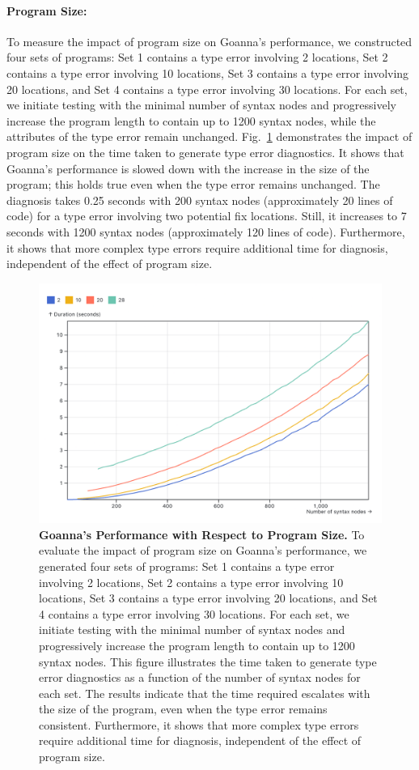 \documentclass[pdflatex,lineno,sn-nature,Numbered]{sn-jnl}%
\begin{document}
\paragraph{Program Size:}
To measure the impact of program size on Goanna's performance, we constructed four sets of programs: Set 1 contains a type error involving 2 locations, Set 2 contains a type error involving 10 locations, Set 3 contains a type error involving 20 locations, and Set 4 contains a type error involving 30 locations. For each set, we initiate testing with the minimal number of syntax nodes and progressively increase the program length to contain up to 1200 syntax nodes, while the attributes of the type error remain unchanged. Fig.~\ref{fig:node-size} demonstrates the impact of program size on the time taken to generate type error diagnostics. It shows that Goanna's performance is slowed down with the increase in the size of the program; this holds true even when the type error remains unchanged. The diagnosis takes 0.25 seconds with 200 syntax nodes (approximately 20 lines of code) for a type error involving two potential fix locations. Still, it increases to 7 seconds with 1200 syntax nodes (approximately 120 lines of code). Furthermore, it shows that more complex type errors require additional time for diagnosis, independent of the effect of program size.

\begin{figure}[ht]
    \centering
    \includegraphics[width=0.8\linewidth]{images/program-size.png}
    \caption{{\bf Goanna's Performance with Respect to Program Size.} To evaluate the impact of program size on Goanna's performance, we generated four sets of programs: Set 1 contains a type error involving 2 locations, Set 2 contains a type error involving 10 locations, Set 3 contains a type error involving 20 locations, and Set 4 contains a type error involving 30 locations. For each set, we initiate testing with the minimal number of syntax nodes and progressively increase the program length to contain up to 1200 syntax nodes. This figure illustrates the time taken to generate type error diagnostics as a function of the number of syntax nodes for each set. The results indicate that the time required escalates with the size of the program, even when the type error remains consistent. Furthermore, it shows that more complex type errors require additional time for diagnosis, independent of the effect of program size.}
    \label{fig:node-size}
\end{figure}
\end{document}
